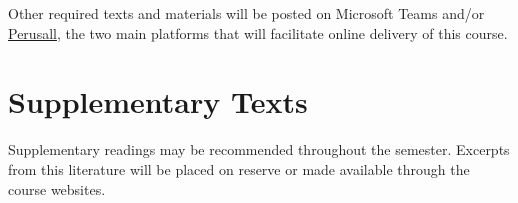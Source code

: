 \documentclass[titlepage]{article}
\begin{document}
Other required texts and materials will be posted on Microsoft Teams and/or \href{https://app.perusall.com/courses/hb-3112-psalms-in-interpretation/_/dashboard}{Perusall}, the two main platforms that will facilitate online delivery of this course.

\section{Supplementary Texts}
\label{supplementary}

Supplementary readings may be recommended throughout the semester.
Excerpts from this literature will be placed on reserve or made
available through the course websites.

%
%
%
%
%
%
%
\end{document}
